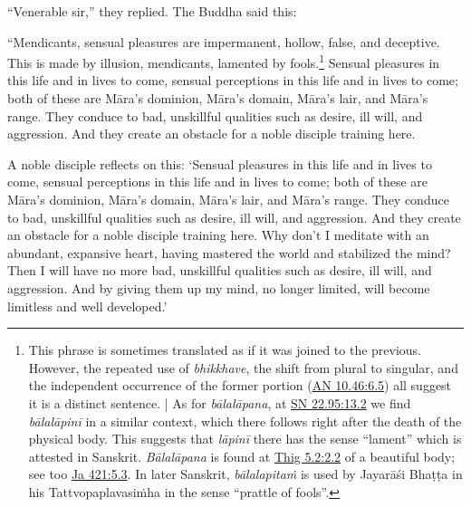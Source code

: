 \documentclass[12pt,openany]{book}%
\begin{document}
“Venerable sir,” they replied. The Buddha said this: 

“Mendicants, sensual pleasures are impermanent, hollow, false, and deceptive. This is made by illusion, mendicants, lamented by fools.\footnote{This phrase is sometimes translated as if it was joined to the previous. However, the repeated use of \textit{bhikkhave}, the shift from plural to singular, and the independent occurrence of the former portion (\href{https://suttacentral.net/an10.46/en/sujato\#6.5}{AN 10.46:6.5}) all suggest it is a distinct sentence. | As for \textit{\textsanskrit{bālalāpana}}, at \href{https://suttacentral.net/sn22.95/en/sujato\#13.2}{SN 22.95:13.2} we find \textit{\textsanskrit{bālalāpinī}} in a similar context, which there follows right after the death of the physical body. This suggests that \textit{\textsanskrit{lāpinī}} there has the sense “lament” which is attested in Sanskrit. \textit{\textsanskrit{Bālalāpana}} is found at \href{https://suttacentral.net/thig5.2/en/sujato\#2.2}{Thig 5.2:2.2} of a beautiful body; see too \href{https://suttacentral.net/ja421/en/sujato\#5.3}{Ja 421:5.3}. In later Sanskrit, \textit{\textsanskrit{bālalapitaṁ}} is used by \textsanskrit{Jayarāśi} \textsanskrit{Bhaṭṭa} in his \textsanskrit{Tattvopaplavasiṁha} in the sense “prattle of fools”. } Sensual pleasures in this life and in lives to come, sensual perceptions in this life and in lives to come; both of these are \textsanskrit{Māra}’s dominion, \textsanskrit{Māra}’s domain, \textsanskrit{Māra}’s lair, and \textsanskrit{Māra}’s range. They conduce to bad, unskillful qualities such as desire, ill will, and aggression. And they create an obstacle for a noble disciple training here. 

A noble disciple reflects on this: ‘Sensual pleasures in this life and in lives to come, sensual perceptions in this life and in lives to come; both of these are \textsanskrit{Māra}’s dominion, \textsanskrit{Māra}’s domain, \textsanskrit{Māra}’s lair, and \textsanskrit{Māra}’s range. They conduce to bad, unskillful qualities such as desire, ill will, and aggression. And they create an obstacle for a noble disciple training here. Why don’t I meditate with an abundant, expansive heart, having mastered the world and stabilized the mind? Then I will have no more bad, unskillful qualities such as desire, ill will, and aggression. And by giving them up my mind, no longer limited, will become limitless and well developed.’ 
\end{document}
